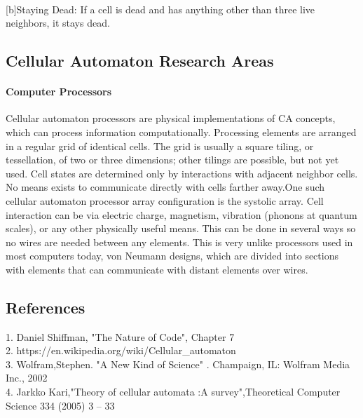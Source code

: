 \documentclass[24 pts]{article}
\begin{document}
\paragraph{}
        [b]Staying Dead: If a cell is dead and has anything other than three live neighbors, it stays dead.

\subsection{Cellular Automaton Research Areas}
\paragraph{Computer Processors}
Cellular automaton processors are physical implementations of CA concepts, which can process information computationally. Processing elements are arranged in a regular grid of identical cells. The grid is usually a square tiling, or tessellation, of two or three dimensions; other tilings are possible, but not yet used. Cell states are determined only by interactions with adjacent neighbor cells. No means exists to communicate directly with cells farther away.One such cellular automaton processor array configuration is the systolic array. Cell interaction can be via electric charge, magnetism, vibration (phonons at quantum scales), or any other physically useful means. This can be done in several ways so no wires are needed between any elements. This is very unlike processors used in most computers today, von Neumann designs, which are divided into sections with elements that can communicate with distant elements over wires.
\subsection{References}
1. Daniel Shiffman, "The Nature of Code", Chapter 7\\
2. https://en.wikipedia.org/wiki/Cellular\_automaton\\
3. Wolfram,Stephen.
"A New
Kind
of Science"
. Champaign,
IL: Wolfram
Media
Inc.,
2002\\
4. Jarkko Kari,"Theory of cellular automata :A survey",Theoretical Computer Science 334 (2005) 3 – 33
\end{document}
